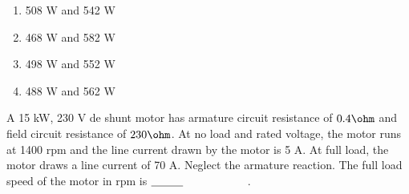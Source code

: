 \begin{enumerate}
    \item 508 W and 542 W
    \item 468 W and 582 W
    \item 498 W and 552 W
    \item 488 W and 562 W
\end{enumerate}
\item A 15 kW, 230 V de shunt motor has armature circuit resistance of $0.4\ohm$ and field circuit resistance of $230\ohm$. At no load and rated voltage, the motor runs at 1400 rpm and the line current drawn by the motor is 5 A. At full load, the motor draws a line current of 70 A. Neglect the armature reaction. The full load speed of the motor in rpm is $\makebox[3cm][l]{\underline{\hspace{1cm}}}$.

